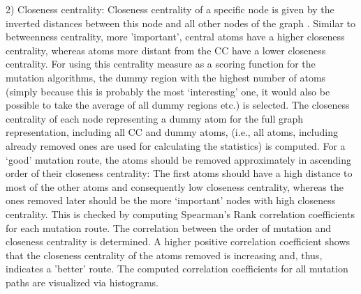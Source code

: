 2) Closeness centrality: Closeness centrality of a specific node is
given by the inverted distances between this node and all other nodes
of the graph \cite{Newman.2010}. Similar to betweenness centrality, more 'important', central atoms have a higher closeness centrality, whereas atoms more distant from the CC have a lower
closeness centrality.
For using this centrality measure as a scoring function for the mutation
algorithms, the dummy region with the highest number of atoms (simply
because this is probably the most \textquoteleft interesting\textquoteright{}
one, it would also be possible to take the average of all dummy regions
etc.) is selected. The closeness centrality of each node representing a dummy atom for
the full graph representation, including all CC and dummy atoms, (i.e., all atoms, including already removed ones are used for calculating the statistics) is
computed. For a ‘good’ mutation route, the atoms should be removed approximately in ascending order of their closeness centrality: The first atoms should have a high distance to most of the other atoms and consequently low closeness centrality, whereas the ones removed later should be the more ‘important’ nodes with high closeness centrality. This is checked by computing Spearman's Rank correlation coefficients for each mutation route. The correlation between the order of mutation and closeness centrality is determined. A higher positive correlation coefficient shows that the
closeness centrality of the atoms removed is increasing and, thus, indicates a 'better' route. The computed correlation coefficients for all mutation paths are visualized via histograms. 


